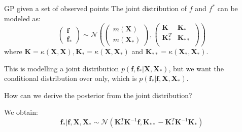 \documentclass[10pt]{beamer}
\begin{document}
\begin{frame}{GP given a set of observed points}
	The joint distribution of $f$ and $f^*$ can be modeled as: 
	$$\left(\begin{array}{r}
		\mathbf{f}\\ 
		\mathbf{f}_*
	\end{array}\right) \sim \mathcal{N} \left(\left(\begin{array}{r}
		m(\mathbf{X}) \\ 
		m(\mathbf{X}_*) 
	\end{array}\right), \left(\begin{array}{rr}
		\mathbf{K}& \mathbf{K}_* \\ 
		\mathbf{K}_*^T& \mathbf{K}_{**} \\
	\end{array}\right)\right)$$
	where $\mathbf{K} = \kappa (\mathbf{X}, \mathbf{X}), \mathbf{K}_* = \kappa (\mathbf{X}, \mathbf{X}_*)$ and $\mathbf{K}_{**} = \kappa (\mathbf{X}_*, \mathbf{X}_*)$. 
	
	This is modelling a joint distribution $p(\mathbf{f}, \mathbf{f}_*|\mathbf{X}, \mathbf{X}_*)$, but we want the conditional distribution over only, which is $p(\mathbf{f}_*| \mathbf{f}, \mathbf{X}, \mathbf{X}_*)$. 
	
	How can we derive the posterior from the joint distribution? 
	
	We obtain: $$ \mathbf{f}_*| \mathbf{f}, \mathbf{X}, \mathbf{X}_* \sim \mathcal{N} \left(\mathbf{K}_*^T \mathbf{K}^{-1} \mathbf{f}, \mathbf{K}_{**} - \mathbf{K}^T_* \mathbf{K}^{-1} \mathbf{K}_*\right)$$
\end{frame}
\end{document}

